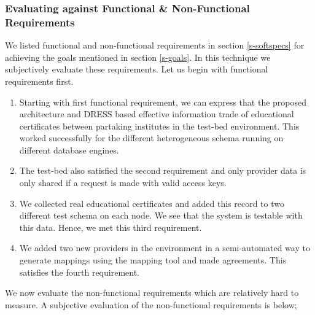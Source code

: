 \documentclass[12pt,a4paper,oneside]{book}
\begin{document}
		\subsubsection{Evaluating against Functional \& Non-Functional Requirements}
		We listed functional and non-functional requirements in section \ref{s-softspecs} for achieving the goals mentioned in section \ref{s-goals}.  In this technique we subjectively evaluate these requirements. Let us begin with functional requirements first.
	\begin{enumerate}  

		\item Starting with first functional requirement, we can express that the proposed architecture and DRESS based effective information trade of educational certificates between partaking institutes in the test-bed environment. This worked successfully for the different heterogeneous schema running on different database engines. 

		\item The test-bed also satisfied the second requirement and only provider data is only shared if a request is made with valid access keys. 
	
		\item We collected real educational certificates and added this record to two different test schema on each node. We see that the system is testable with this data. Hence, we met this third requirement.
		
		\item We added two new providers in the environment in a semi-automated way to generate mappings using the mapping tool and made agreements. This satisfies the fourth requirement.

	\end{enumerate}
		
	We now evaluate the non-functional requirements which are relatively hard to measure. A subjective evaluation of the non-functional requirements is below;
	
\end{document}
